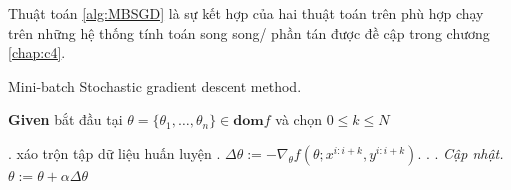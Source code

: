 Thuật toán \ref{alg:MBSGD} \cite{konevcny2016mini} là sự kết hợp của hai thuật toán trên phù hợp chạy trên những hệ thống tính toán song song/ phần tán được đề cập trong chương \ref{chap:c4}.
\begin{algorithm}[H]\caption{\label{alg:MBSGD}Mini-batch Stochastic gradient descent method.}
	\begin{algorithmic}[1]
		\STATE \textbf{Given} bắt đầu tại $\theta=\{\theta_1,\dots,\theta_n\} \in \textbf{dom} f$ và chọn $0 \leq k \leq N$
		
		\REPEAT
		. xáo trộn tập dữ liệu huấn luyện
		. $\Delta \theta:=-\nabla_\theta f\left( \theta;x^{i:i+k},y^{i:i+k} \right) $.
		. 
		. \textit{Cập nhật.} $\theta:=\theta+\alpha\Delta \theta$
		\ENDFOR
	\end{algorithmic}
\end{algorithm}


